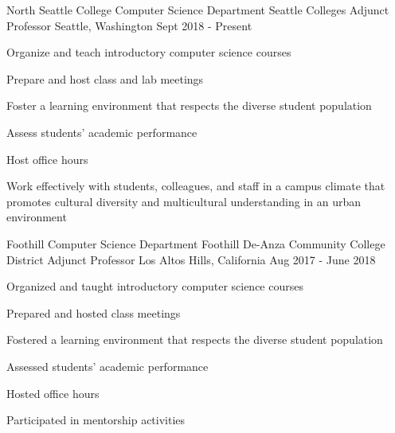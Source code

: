 \begin{cventries}

  \cventry
{North Seattle College Computer Science Department \newline Seattle Colleges}
    {Adjunct Professor}
    {Seattle, Washington}
    {Sept 2018 - Present}
    {
      \begin{cvitems}
	\item {Organize and teach introductory computer science courses}\\
	\begin{cvitems}
         \item Prepare and host class and lab meetings
                  \item Foster a learning environment that respects the diverse student population
		\item Assess students' academic performance
		\item Host office hours
	\end{cvitems}
	\vspace{2mm}
	\item Work effectively with students, colleagues, and staff in a campus climate that promotes cultural diversity and multicultural understanding in an urban environment
      \end{cvitems}
    }

  \cventry
{Foothill Computer Science Department \newline Foothill De-Anza Community College District}
    {Adjunct Professor}
    {Los Altos Hills, California}
    {Aug 2017 - June 2018}
    {
      \begin{cvitems}
	\item {Organized and taught introductory computer science courses}\\
	\begin{cvitems}
         \item Prepared and hosted class meetings
                  \item Fostered a learning environment that respects the diverse student population
		\item Assessed students' academic performance
		\item Hosted office hours
	\end{cvitems}
	\vspace{2mm}
	\item Participated in mentorship activities
      \end{cvitems}
    }


\end{cventries}
